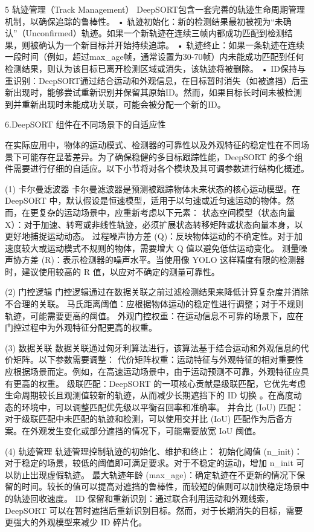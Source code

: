 5 轨迹管理（Track Management）
DeepSORT包含一套完善的轨迹生命周期管理机制，以确保追踪的鲁棒性。
• 轨迹初始化：新的检测结果最初被视为“未确认”（Unconfirmed）轨迹。如果一个新轨迹在连续三帧内都成功匹配到检测结果，则被确认为一个新目标并开始持续追踪。
• 轨迹终止：如果一条轨迹在连续一段时间（例如，超过max_age帧，通常设置为30-70帧）内未能成功匹配到任何检测结果，则认为该目标已离开检测区域或消失，该轨迹将被删除。
• ID保持与重识别：DeepSORT通过结合运动和外观信息，在目标暂时消失（如被遮挡）后重新出现时，能够尝试重新识别并保留其原始ID。然而，如果目标长时间未被检测到并重新出现时未能成功关联，可能会被分配一个新的ID。

6.DeepSORT 组件在不同场景下的自适应性

在实际应用中，物体的运动模式、检测器的可靠性以及外观特征的稳定性在不同场景下可能存在显著差异。为了确保稳健的多目标跟踪性能，DeepSORT 的多个组件需要进行仔细的自适应。以下小节将对各个模块及其可调参数进行结构化概述。

(1) 卡尔曼滤波器
卡尔曼滤波器是预测被跟踪物体未来状态的核心运动模型。在 DeepSORT 中，默认假设是恒速模型，适用于以匀速或近匀速运动的物体。然而，在更复杂的运动场景中，应重新考虑以下元素：
状态空间模型（状态向量 X）：对于加速、转弯或非线性轨迹，必须扩展状态转移矩阵或状态向量本身，以更好地捕捉运动动态。
过程噪声协方差 (Q)：反映物体运动的不确定性。对于加速度较大或运动模式不规则的物体，需要增大 Q 值以避免低估运动变化。
测量噪声协方差 (R)：表示检测器的噪声水平。当使用像 YOLO 这样精度有限的检测器时，建议使用较高的 R 值，以应对不确定的测量可靠性。

(2) 门控逻辑
门控逻辑通过在数据关联之前过滤检测结果来降低计算复杂度并消除不合理的关联。
马氏距离阈值：应根据物体运动的稳定性进行调整；对于不规则轨迹，可能需要更高的阈值。
外观门控权重：在运动信息不可靠的场景下，应在门控过程中为外观特征分配更高的权重。

(3) 数据关联
数据关联通过匈牙利算法进行，该算法基于结合运动和外观信息的代价矩阵。以下参数需要调整：
代价矩阵权重：运动特征与外观特征的相对重要性应根据场景而定。例如，在高速运动场景中，由于运动预测不可靠，外观特征应具有更高的权重。
级联匹配：DeepSORT 的一项核心贡献是级联匹配，它优先考虑生命周期较长且观测值较新的轨迹，从而减少长期遮挡下的 ID 切换 \cite{134}。在高度动态的环境中，可以调整匹配优先级以平衡召回率和准确率。
并合比 (IoU) 匹配：对于级联匹配中未匹配的轨迹和检测，可以使用交并比 (IoU) 匹配作为后备方案。在外观发生变化或部分遮挡的情况下，可能需要放宽 IoU 阈值。

(4) 轨迹管理
轨迹管理控制轨迹的初始化、维护和终止：
初始化阈值 (n_init)：对于稳定的场景，较低的阈值即可满足要求。对于不稳定的运动，增加 n_init 可以防止出现虚假轨迹。
最大轨迹年龄 (max_age)：确定轨迹在不更新的情况下保留的时间。较长的值可以提高对遮挡的鲁棒性，而较短的值则可以加快稳定场景中的轨迹回收速度。
ID 保留和重新识别：通过联合利用运动和外观线索，DeepSORT 可以在暂时遮挡后重新识别目标。然而，对于长期消失的目标，需要更强大的外观模型来减少 ID 碎片化。

